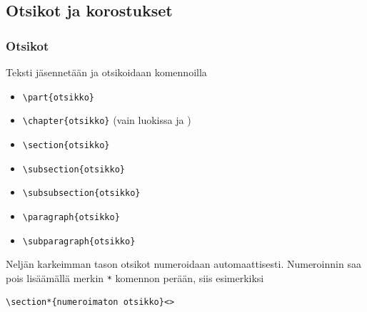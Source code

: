 \subsection{Otsikot ja korostukset}
\begin{frame}[fragile]
    \frametitle{Otsikot}
    Teksti jäsennetään ja otsikoidaan komennoilla 
    \begin{itemize}[<+->]
        \item \lstinline-\part{otsikko}-
        \item \lstinline-\chapter{otsikko}- (vain luokissa  ja )
        \item \lstinline-\section{otsikko}-
        \item \lstinline-\subsection{otsikko}-
        \item \lstinline-\subsubsection{otsikko}-
        \item \lstinline-\paragraph{otsikko}-
        \item \lstinline-\subparagraph{otsikko}-
    \end{itemize} \pause
    Neljän karkeimman tason otsikot numeroidaan automaattisesti. \pause Numeroinnin saa pois lisäämällä merkin \lstinline-*- komennon perään, siis esimerkiksi 
    \begin{lstlisting}
\section*{numeroimaton otsikko}<>
    \end{lstlisting}
\end{frame}

